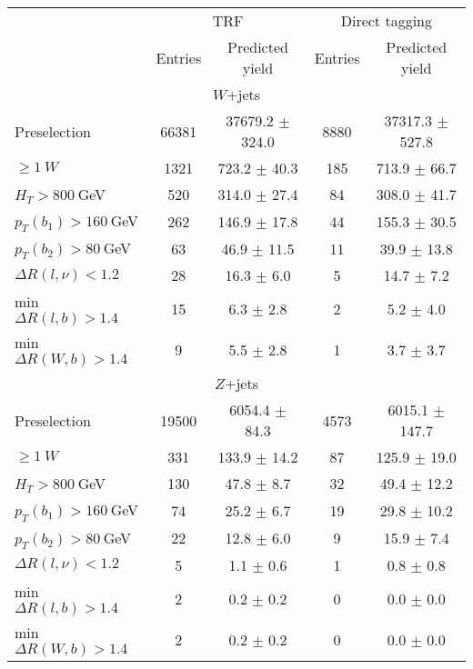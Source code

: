 \begin{tabular}{lcccc} \toprule
  & \multicolumn{2}{c}{TRF} & \multicolumn{2}{c}{Direct tagging}\\
  & Entries & Predicted yield & Entries & Predicted yield  \\
\midrule
\multicolumn{5}{c}{$W$+jets} \\
\midrule
Preselection            & 66381  & 37679.2 	$\pm$ 	324.0 	 & 8880  & 37317.3 	$\pm$ 	527.8 	\\
$\geq 1~W$              & 1321  & 723.2 	$\pm$ 	40.3 	 & 185  & 713.9 	$\pm$ 	66.7 	\\
$H_T>800~$GeV           & 520  & 314.0 	        $\pm$ 	27.4 	 & 84  & 308.0 	        $\pm$ 	41.7 	\\
$p_T(b_1) > 160~$GeV    & 262  & 146.9 	        $\pm$ 	17.8 	 & 44  & 155.3 	        $\pm$ 	30.5 	\\
$p_T(b_2) >80~$GeV      & 63  & 46.9 	        $\pm$ 	11.5 	 & 11  & 39.9 	        $\pm$ 	13.8 	\\
$\Delta R(l,\nu)<1.2$   & 28  & 16.3 	        $\pm$ 	6.0 	 & 5  & 14.7 	        $\pm$ 	7.2 	\\
min$\Delta R(l,b)>1.4$  & 15  & 6.3 	        $\pm$ 	2.8 	 & 2  & 5.2 	        $\pm$ 	4.0 	\\
min$\Delta R(W,b)>1.4$  & 9  & 5.5 	        $\pm$ 	2.8 	 & 1  & 3.7 	        $\pm$ 	3.7 	\\
\midrule
\multicolumn{5}{c}{$Z$+jets} \\
\midrule 
Preselection            & 19500  & 6054.4 	$\pm$ 	84.3 	 & 4573  & 6015.1 	$\pm$ 	147.7 	\\
$\geq 1~W$              & 331  & 133.9 	        $\pm$ 	14.2 	 & 87  & 125.9 	        $\pm$ 	19.0 	\\
$H_T>800~$GeV           & 130  & 47.8 	        $\pm$ 	8.7 	 & 32  & 49.4 	        $\pm$ 	12.2 	\\
$p_T(b_1) > 160~$GeV    & 74  & 25.2 	        $\pm$ 	6.7 	 & 19  & 29.8 	        $\pm$ 	10.2 	\\
$p_T(b_2) >80~$GeV      & 22  & 12.8 	        $\pm$ 	6.0 	 & 9  & 15.9 	        $\pm$ 	7.4 	\\
$\Delta R(l,\nu)<1.2$   & 5  & 1.1 	        $\pm$ 	0.6 	 & 1  & 0.8 	        $\pm$ 	0.8 	\\
min$\Delta R(l,b)>1.4$  & 2  & 0.2 	        $\pm$ 	0.2 	 & 0  & 0.0 	        $\pm$ 	0.0 	\\
min$\Delta R(W,b)>1.4$  & 2  & 0.2 	        $\pm$ 	0.2 	 & 0  & 0.0 	        $\pm$ 	0.0 	\\

\end{tabular}
